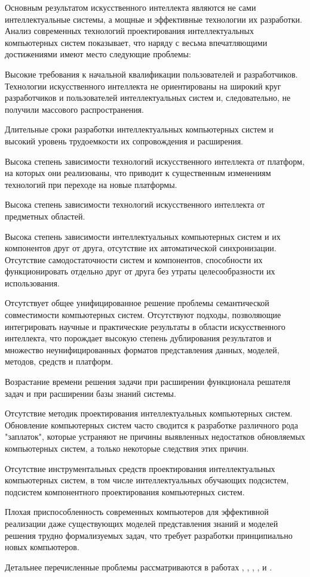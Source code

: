 \begin{partbacktext}
Основным результатом искусственного интеллекта являются не сами интеллектуальные системы, а мощные и эффективные технологии их разработки. Анализ современных технологий проектирования интеллектуальных компьютерных систем показывает, что наряду с весьма впечатляющими достижениями имеют место следующие проблемы:
\begin{textitemize}
	\item Высокие требования к начальной квалификации пользователей и разработчиков. Технологии искусственного интеллекта не ориентированы на широкий круг разработчиков и пользователей интеллектуальных систем и, следовательно, не получили массового распространения.
	\item Длительные сроки разработки интеллектуальных компьютерных систем и высокий уровень трудоемкости их сопровождения и расширения.
	\item Высока степень зависимости технологий искусственного интеллекта от платформ, на которых они реализованы, что приводит к существенным изменениям технологий при переходе на новые платформы.
	\item Высока степень зависимости технологий искусственного интеллекта от предметных областей.
	\item Высока степень зависимости интеллектуальных компьютерных систем и их компонентов друг от друга, отсутствие их автоматической синхронизации. Отсутствие самодостаточности систем и компонентов, способности их функционировать отдельно друг от друга без утраты целесообразности их использования.
	\item Отсутствует общее унифицированное решение проблемы семантической совместимости компьютерных систем. Отсутствуют подходы, позволяющие интегрировать научные и практические результаты в области искусственного интеллекта, что порождает высокую степень дублирования результатов и множество неунифицированных форматов представления данных, моделей, методов, средств и платформ.
	\item Возрастание времени решения задачи при расширении функционала решателя задач и при расширении базы знаний системы.
	\item Отсутствие методик проектирования интеллектуальных компьютерных систем. Обновление компьютерных систем часто сводится к разработке	различного рода "заплаток"{}, которые устраняют не причины выявленных недостатков обновляемых компьютерных систем, а только некоторые следствия этих причин.
	\item Отсутствие инструментальных средств проектирования интеллектуальных компьютерных систем, в том числе интеллектуальных обучающих подсистем, подсистем компонентного проектирования компьютерных систем.
	\item Плохая приспособленность современных компьютеров для эффективной реализации даже существующих моделей представления знаний и моделей решения трудно формализуемых задач, что требует разработки принципиально новых компьютеров.
\end{textitemize}
Детальнее перечисленные проблемы рассматриваются в работах , , , ,  и .


\end{partbacktext}
